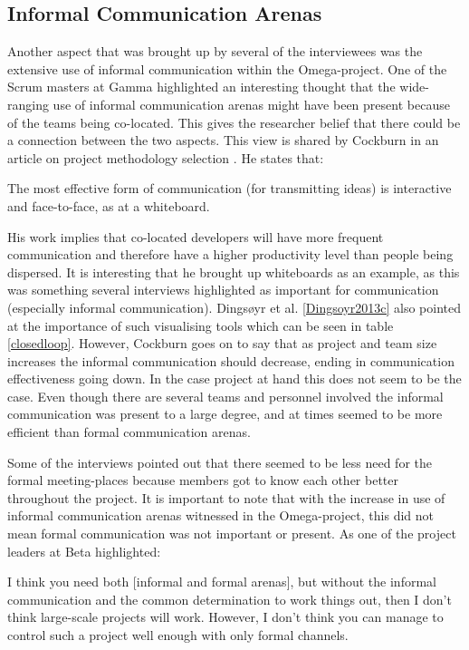 \subsection{Informal Communication Arenas}

Another aspect that was brought up by several of the interviewees was the extensive use of informal communication within the Omega-project. One of the Scrum masters at Gamma highlighted an interesting thought that the wide-ranging use of informal communication arenas might have been present because of the teams being co-located. This gives the researcher belief that there could be a connection between the two aspects. This view is shared by Cockburn in an article on project methodology selection \cite{}. He states that:


\begin{fancyquotes}
The most effective form of communication (for transmitting ideas) is interactive and face-to-face, as at a whiteboard.
\end{fancyquotes}

His work implies that co-located developers will have more frequent communication and therefore have a higher productivity level than people being dispersed. It is interesting that he brought up whiteboards as an example, as this was something several interviews highlighted as important for communication (especially informal communication). Dingsøyr et al. \ref{Dingsoyr2013c} also pointed at the importance of such visualising tools which can be seen in table \ref{closedloop}. However, Cockburn goes on to say that as project and team size increases the informal communication should decrease, ending in communication effectiveness going down. In the case project at hand this does not seem to be the case. Even though there are several teams and personnel involved the informal communication was present to a large degree, and at times seemed to be more efficient than formal communication arenas.

Some of the interviews pointed out that there seemed to be less need for the formal meeting-places because members got to know each other better throughout the project. It is important to note that with the increase in use of informal communication arenas witnessed in the Omega-project, this did not mean formal communication was not important or present. As one of the project leaders at Beta highlighted:

\begin{fancyquotes}
I think you need both [informal and formal arenas], but without the informal communication and the common determination to work things out, then I don't think large-scale projects will work. However, I don't think you can manage to control such a project well enough with only formal channels.
\end{fancyquotes}

